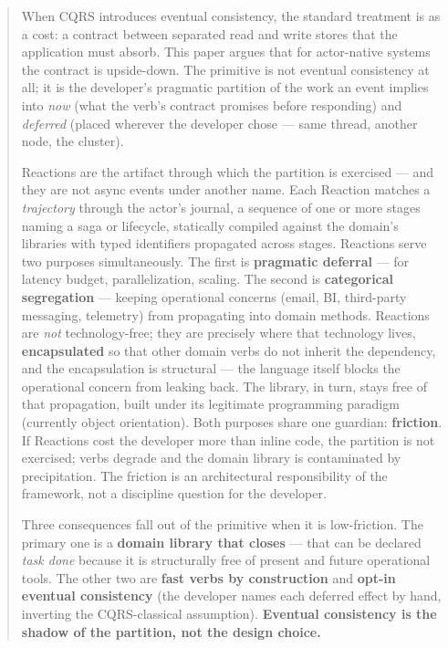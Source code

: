 \documentclass[
]{article}
\begin{document}
\begin{quote}
When CQRS introduces eventual consistency, the standard treatment is as
a cost: a contract between separated read and write stores that the
application must absorb. This paper argues that for actor-native systems
the contract is upside-down. The primitive is not eventual consistency
at all; it is the developer's pragmatic partition of the work an event
implies into \emph{now} (what the verb's contract promises before
responding) and \emph{deferred} (placed wherever the developer chose ---
same thread, another node, the cluster).

Reactions are the artifact through which the partition is exercised ---
and they are not async events under another name. Each Reaction matches
a \emph{trajectory} through the actor's journal, a sequence of one or
more stages naming a saga or lifecycle, statically compiled against the
domain's libraries with typed identifiers propagated across stages.
Reactions serve two purposes simultaneously. The first is
\textbf{pragmatic deferral} --- for latency budget, parallelization,
scaling. The second is \textbf{categorical segregation} --- keeping
operational concerns (email, BI, third-party messaging, telemetry) from
propagating into domain methods. Reactions are \emph{not}
technology-free; they are precisely where that technology lives,
\textbf{encapsulated} so that other domain verbs do not inherit the
dependency, and the encapsulation is structural --- the language itself
blocks the operational concern from leaking back. The library, in turn,
stays free of that propagation, built under its legitimate programming
paradigm (currently object orientation). Both purposes share one
guardian: \textbf{friction}. If Reactions cost the developer more than
inline code, the partition is not exercised; verbs degrade and the
domain library is contaminated by precipitation. The friction is an
architectural responsibility of the framework, not a discipline question
for the developer.

Three consequences fall out of the primitive when it is low-friction.
The primary one is a \textbf{domain library that closes} --- that can be
declared \emph{task done} because it is structurally free of present and
future operational tools. The other two are \textbf{fast verbs by
construction} and \textbf{opt-in eventual consistency} (the developer
names each deferred effect by hand, inverting the CQRS-classical
assumption). \textbf{Eventual consistency is the shadow of the
partition, not the design choice.}
\end{quote}
\end{document}
